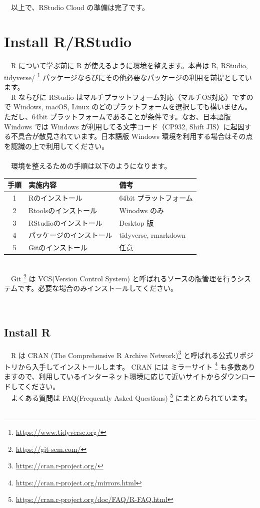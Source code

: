 \documentclass[
  12pt,
]{book}
\DeclareRobustCommand{\href}[2]{#2\footnote{\url{#1}}}
\begin{document}
　\\
　以上で、RStudio Cloud の準備は完了です。

\hypertarget{install-rrstudio}{%
\chapter{Install R/RStudio}\label{install-rrstudio}}

　R について学ぶ前に R が使えるように環境を整えます。本書は R, RStudio, \href{https://www.tidyverse.org/}{tidyverse/ } パッケージならびにその他必要なパッケージの利用を前提としています。\\
　R ならびに RStudio はマルチプラットフォーム対応（マルチOS対応）ですので Windows, macOS, Linux のどのプラットフォームを選択しても構いません。ただし、64bit プラットフォームであることが条件です。なお、日本語版 Windows では Windows が利用してる文字コード（CP932, Shift JIS）に起因する不具合が散見されています。日本語版 Windows 環境を利用する場合はその点を認識の上で利用してください。\\
　\\
　環境を整えるための手順は以下のようになります。

\begin{longtable}[]{@{}cll@{}}
\toprule
手順 & 実施内容 & 備考 \\
\midrule
\endhead
1 & Rのインストール & 64bit プラットフォーム \\
2 & Rtoolsのインストール & Winodws のみ \\
3 & RStudioのインストール & Desktop 版 \\
4 & パッケージのインストール & tidyverse, rmarkdown \\
5 & Gitのインストール & 任意 \\
\bottomrule
\end{longtable}

　\\
　\href{https://git-scm.com/}{Git } は VCS(Version Control System) と呼ばれるソースの版管理を行うシステムです。必要な場合のみインストールしてください。

　

\hypertarget{install-r}{%
\section{Install R}\label{install-r}}

　R は \href{https://cran.r-project.org/}{CRAN (The Comprehensive R Archive Network)} と呼ばれる公式リポジトリから入手してインストールします。 CRAN には \href{https://cran.r-project.org/mirrors.html}{ミラーサイト } も多数ありますので、利用しているインターネット環境に応じて近いサイトからダウンロードしてください。\\
　よくある質問は \href{https://cran.r-project.org/doc/FAQ/R-FAQ.html}{FAQ(Frequently Asked Questions) } にまとめられています。\\
　
\end{document}
